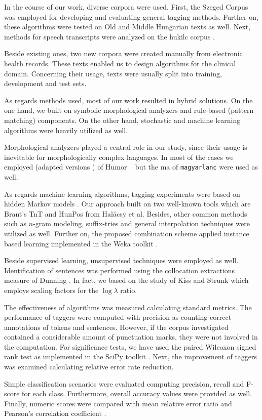 In the course of our work, diverse corpora were used. 
First, the Szeged Corpus \cite{Csendes2004} was employed for developing and evaluating general tagging methods.
Further on, these algorithms were tested on Old and Middle Hungarian \cite{Novak2013} texts as well.
Next, methods for speech transcripts were analyzed on the \acrshort{hukilc} corpus \cite{Matyus2014}.

Beside existing ones, two new corpora were created manually from electronic health records.
These texts enabled us to design algorithms for the clinical domain.
Concerning their usage, texts were usually split into training, development and test sets.

As regards methods used, most of our work resulted in hybrid solutions.
On the one hand, we built on symbolic morphological analyzers and rule-based (pattern matching) components. 
On the other hand, stochastic and machine learning algorithms were heavily utilized as well.

Morphological analyzers played a central role in our study, since their usage is inevitable for morphologically complex languages.
In most of the cases we employed (adapted versions \cite{Novak2013,NovakOMK,Orosz2013}) of Humor ~\cite{Proszeky1994,Novak2003,Proszeky2005} but the \acrshort{ma} of \texttt{magyarlanc} \cite{zsibrata2013magyarlanc} were used as well.

As regards machine learning algorithms, tagging experiments were based on hidden Markov models \cite{Rabiner1989,Samuelsson1993}. 
Our approach built on two well-known tools which are Brant's TnT \cite{Brants2000} and HunPos \cite{Halacsy2007} from Halácsy et al. 
Besides, other common methods such as $n$-gram modeling, suffix-tries and general interpolation techniques were utilized as well.
Further on, the proposed combination scheme applied instance based learning \cite{Aha1991} implemented in the Weka toolkit \cite{Hall2009}.

Beside supervised learning, unsupervised techniques were employed as well.
Identification of sentences was performed using the collocation extractions measure of Dunning \cite{dunning1993accurate}.
In fact, we based on the study of Kiss and Strunk \cite{kiss2006unsupervised} which employs scaling factors for the $\log\lambda$ ratio.

The effectiveness of algorithms was measured calculating standard metrics.
The performance of taggers were computed with precision as counting correct annotations of tokens and sentences.
However, if the corpus investigated contained a considerable amount of punctuation marks, they were not involved in the computation.
For significance tests, we have used the paired Wilcoxon signed rank test as implemented in the SciPy toolkit \cite{scipy}.
Next, the improvement of taggers was examined calculating relative error rate reduction. 

Simple classification scenarios were evaluated computing precision, recall and F-score for each class.
Furthermore, overall accuracy values were provided as well.
Finally, numeric scores were compared with mean relative error \cite{Witten2011} ratio and Pearson's correlation coefficient \cite{Witten2011}.